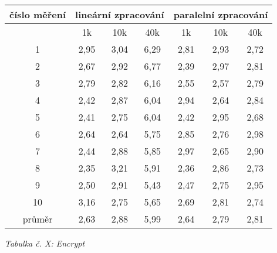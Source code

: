 \documentclass{article}
\begin{document}
\begin{center}
	\begin{tabular}{ c | c | c | c | c | c | c }
		\textbf{číslo měření} & \multicolumn{3}{c|}{\textbf{lineární zpracování}} & \multicolumn{3}{|c}{\textbf{paralelní zpracování}} \\
		\hline
		& 1k & 10k & 40k & 1k & 10k & 40k \\
		\hline
		1 & 2,95 & 3,04 & 6,29 & 2,81 & 2,93 & 2,72 \\
		\hline
		2 & 2,67 & 2,92 & 6,77 & 2,39 & 2,97 & 2,81 \\
		\hline
		3 & 2,79 & 2,82 & 6,16 & 2,55 & 2,57 & 2,79 \\
		\hline
		4 & 2,42 & 2,87 & 6,04 & 2,94 & 2,64 & 2,84 \\
		\hline
		5 & 2,41 & 2,75 & 6,04 & 2,42 & 2,95 & 2,68 \\
		\hline
		6 & 2,64 & 2,64 & 5,75 & 2,85 & 2,76 & 2,98 \\
		\hline
		7 & 2,44 & 2,88 & 5,85 & 2,97 & 2,65 & 2,90 \\
		\hline
		8 & 2,35 & 3,21 & 5,91 & 2,36 & 2,86 & 2,73 \\
		\hline
		9 & 2,50 & 2,91 & 5,43 & 2,47 & 2,75 & 2,95 \\
		\hline
		10 & 3,16 & 2,75 & 5,65 & 2,69 & 2,81 & 2,74 \\
		\hline
		průměr & 2,63 & 2,88 & 5,99 & 2,64 & 2,79 & 2,81 \\
	\end{tabular}
	\newline
	\textit{Tabulka č. X: Encrypt}
\end{center}
\end{document}
